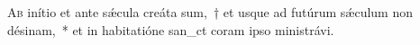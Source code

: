 \lettrine{A}{b} inítio et ante sǽcula creáta sum,~† et usque ad futúrum sǽculum non désinam,~* et in habitatióne san\_ct coram i\-pso ministrávi.